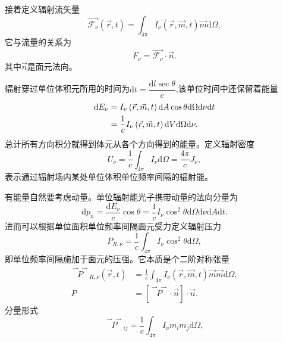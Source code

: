 \documentclass[../天体物理基础.tex]{subfiles}
\begin{document}
接着定义辐射流矢量
\begin{equation}
\vec{\mathcal{F}_{\nu}}(\vec{r},t)=\int_{4\pi}I_{\nu}\left(\vec{r},\vec{m},t\right)\vec{m}\mathrm{d}\Omega,
\end{equation}
它与流量的关系为
\begin{equation}
F_{\nu}=\vec{\mathcal{F}_{\nu}}\cdot\vec{n}.
\end{equation}
其中$\vec{n}$是面元法向。

辐射穿过单位体积元所用的时间为$\mathrm{d}t=\dfrac{\mathrm{d}l\sec\theta}{c}$,该单位时间中还保留着能量
\begin{align}
\mathrm{d}E_{\nu}&=I_\nu\left(\vec{r},\vec{m},t\right)\mathrm{d}A\cos\theta\mathrm{d}\Omega\mathrm{d}\nu\mathrm{d}t\notag\\
&=\frac{1}{c}I_\nu\left(\vec{r},\vec{m},t\right)\mathrm{d}V\mathrm{d}\Omega\mathrm{d}\nu.
\end{align}
总计所有方向积分就得到体元从各个方向得到的能量。定义辐射密度
\begin{equation}
U_{\nu}=\frac1c\int_{4\pi}I_{\nu}\mathrm{d}\Omega=\frac{4\pi}{c}J_{\nu},
\end{equation}
表示通过辐射场内某处单位体积单位频率间隔的辐射能。

有能量自然要考虑动量。单位辐射能光子携带动量的法向分量为
\begin{equation}
\mathrm{d}p_{n}=\frac{\mathrm{d}E_{\nu}}{c}\cos\theta=\frac{1}{c}I_{\nu}\cos^{2}\theta\mathrm{d}\Omega\mathrm{d}\nu\mathrm{d}A\mathrm{d}t.
\end{equation}
进而可以根据单位面积单位频率间隔面元受力定义辐射压力
\begin{equation}
P_{R,\nu}=\frac1c\int_{4\pi}I_{\nu}\cos^{2}\theta\mathrm{d}\Omega,
\end{equation}
即单位频率间隔施加于面元的压强。它本质是个二阶对称张量
\begin{align}
\overset{\rightharpoonup\!\!\!\rightharpoonup}{P}_{R,\nu}\left(\vec{r},t\right)&=\frac{1}{c}\int_{4\pi}I_\nu\left(\vec{r},\vec{m},t\right)\vec{m}\vec{m}\mathrm{d}\Omega,\\
P&=\left[\overset{\rightharpoonup\!\!\!\rightharpoonup}P\cdot\vec n\right]\cdot\vec n.
\end{align}
分量形式
\begin{equation}
\overset{\rightharpoonup\!\!\!\rightharpoonup}P_{ij}=\frac{1}{c}\int_{4\pi}I_{\nu}m_{i}m_{j}\mathrm{d}\Omega,
\end{equation}
\end{document}
